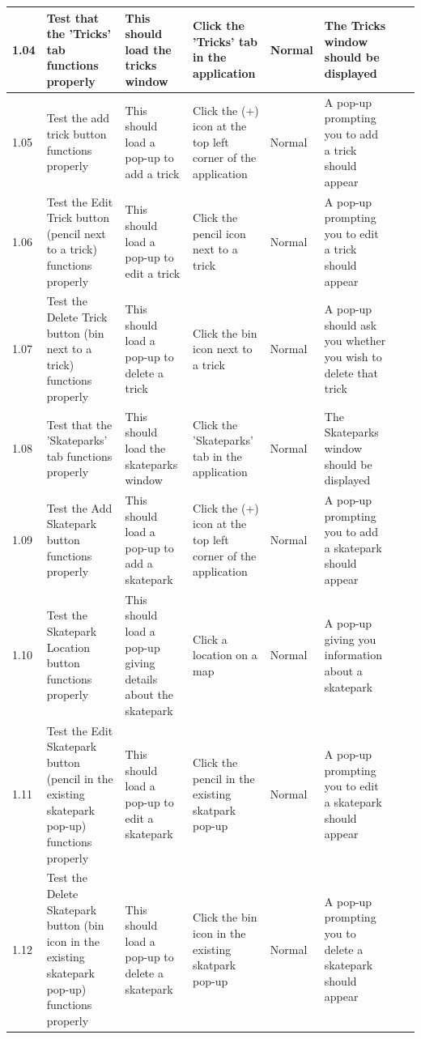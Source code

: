\begin{landscape}
\begin{center}
\begin{longtable}{|p{1.5cm}|p{2.5cm}|p{2.5cm}|p{2cm}|p{2cm}|p{2cm}|p{2cm}|p{2cm}|}
1.04 & Test that the 'Tricks' tab functions properly & This should load the tricks window & Click the 'Tricks' tab in the application & Normal & The Tricks window should be displayed & & \\ \hline

1.05 & Test the add trick button functions properly & This should load a pop-up to add a trick & Click the (+) icon at the top left corner of the application & Normal & A pop-up prompting you to add a trick should appear &  \\ \hline

1.06 & Test the Edit Trick button (pencil next to a trick) functions properly & This should load a pop-up to edit a trick & Click the pencil icon next to a trick & Normal & A pop-up prompting you to edit a trick should appear &  \\ \hline

1.07 & Test the Delete Trick button (bin next to a trick) functions properly & This should load a pop-up to delete a trick & Click the bin icon next to a trick & Normal & A pop-up should ask you whether you wish to delete that trick &  \\ \hline



1.08 & Test that the 'Skateparks' tab functions properly & This should load the skateparks window &Click the 'Skateparks' tab in the application & Normal & The Skateparks window should be displayed & & \\ \hline

1.09 & Test the Add Skatepark button functions properly &  This should load a pop-up to add a skatepark & Click the (+) icon at the top left corner of the application & Normal & A pop-up prompting you to add a skatepark should appear & &  \\ \hline

1.10 & Test the Skatepark Location button functions properly & This should load a pop-up giving details about the skatepark & Click a location on a map & Normal & A pop-up giving you information about a skatepark & & \\ \hline

1.11 & Test the Edit Skatepark button (pencil in the existing skatepark pop-up) functions properly & This should load a pop-up to edit a skatepark & Click the pencil in the existing skatpark pop-up & Normal & A pop-up prompting you to edit a skatepark should appear &  & \\ \hline

1.12 &  Test the Delete Skatepark button (bin icon in the existing skatepark pop-up) functions properly & This should load a pop-up to delete a skatepark & Click the bin icon in the existing skatpark pop-up & Normal & A pop-up prompting you to delete a skatepark should appear & & \\ \hline


\end{longtable}
\end{center}
\end{landscape}
